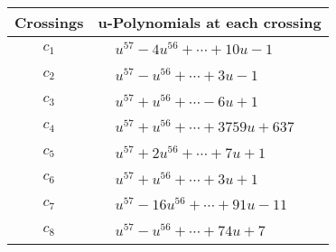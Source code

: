 \documentclass[1p]{elsarticle_modified}
\theoremstyle{definition}
\begin{document}
\begin{tabular}{m{50pt}|m{274pt}}
Crossings & \hspace{64pt}u-Polynomials at each crossing \\
\hline $$\begin{aligned}c_{1}\end{aligned}$$&$\begin{aligned}
&u^{57}-4 u^{56}+\cdots+10 u-1
\end{aligned}$\\
\hline $$\begin{aligned}c_{2}\end{aligned}$$&$\begin{aligned}
&u^{57}- u^{56}+\cdots+3 u-1
\end{aligned}$\\
\hline $$\begin{aligned}c_{3}\end{aligned}$$&$\begin{aligned}
&u^{57}+u^{56}+\cdots-6 u+1
\end{aligned}$\\
\hline $$\begin{aligned}c_{4}\end{aligned}$$&$\begin{aligned}
&u^{57}+u^{56}+\cdots+3759 u+637
\end{aligned}$\\
\hline $$\begin{aligned}c_{5}\end{aligned}$$&$\begin{aligned}
&u^{57}+2 u^{56}+\cdots+7 u+1
\end{aligned}$\\
\hline $$\begin{aligned}c_{6}\end{aligned}$$&$\begin{aligned}
&u^{57}+u^{56}+\cdots+3 u+1
\end{aligned}$\\
\hline $$\begin{aligned}c_{7}\end{aligned}$$&$\begin{aligned}
&u^{57}-16 u^{56}+\cdots+91 u-11
\end{aligned}$\\
\hline $$\begin{aligned}c_{8}\end{aligned}$$&$\begin{aligned}
&u^{57}- u^{56}+\cdots+74 u+7
\end{aligned}$\\

\end{tabular}
\end{document}
